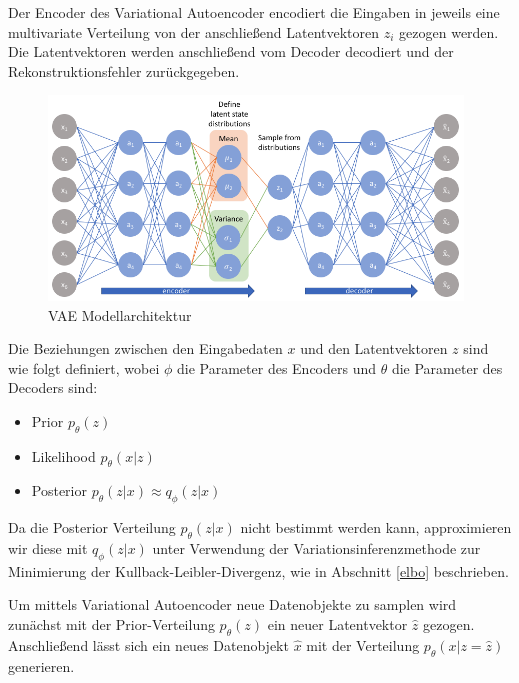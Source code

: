 Der Encoder des Variational Autoencoder encodiert die Eingaben in jeweils eine multivariate Verteilung von der anschließend Latentvektoren $z_i$ gezogen werden. 
Die Latentvektoren werden anschließend vom Decoder decodiert und der Rekonstruktionsfehler zurückgegeben.


\begin{figure}[h]
    \centering
    \includegraphics[width=11cm]{bilder/vae}
    \caption{VAE Modellarchitektur \citep{jordan_2018}}
    \label{vae_model}
\end{figure}

Die Beziehungen zwischen den Eingabedaten $x$ und den Latentvektoren $z$ sind wie folgt definiert, wobei $\phi$ die Parameter des Encoders und $\theta$ die Parameter des Decoders sind:
\begin{itemize}
\item Prior $p_\theta (z)$
\item Likelihood $p_\theta (x|z)$
\item Posterior $p_\theta (z|x)  \approx q_\phi (z|x)$
\end{itemize}

Da die Posterior Verteilung $p_\theta (z|x)$ nicht bestimmt werden kann, approximieren wir diese mit $q_\phi (z|x)$ unter Verwendung der Variationsinferenzmethode zur Minimierung der Kullback-Leibler-Divergenz, wie in Abschnitt \ref{elbo} beschrieben.

Um mittels Variational Autoencoder neue Datenobjekte zu samplen wird zunächst mit der Prior-Verteilung $p_\theta (z)$ ein neuer Latentvektor $\hat{z}$ gezogen. Anschließend lässt sich ein neues Datenobjekt $\hat{x}$ mit der Verteilung $p_\theta (x|z=\hat{z})$ generieren.
